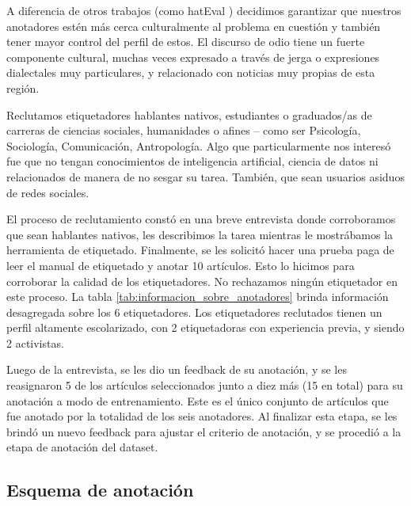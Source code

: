 A diferencia de otros trabajos (como hatEval \cite{hateval2019semeval}) decidimos garantizar que nuestros anotadores estén más cerca culturalmente al problema en cuestión y también tener mayor control del perfil de estos. El discurso de odio tiene un fuerte componente cultural, muchas veces expresado a través de jerga o expresiones dialectales muy particulares, y relacionado con noticias muy propias de esta región.

Reclutamos etiquetadores hablantes nativos, estudiantes o graduados/as de carreras de ciencias sociales, humanidades o afines -- como ser Psicología, Sociología, Comunicación, Antropología. Algo que particularmente nos interesó fue que no tengan conocimientos de inteligencia artificial, ciencia de datos ni relacionados de manera de no sesgar su tarea. También, que sean usuarios asiduos de redes sociales.

El proceso de reclutamiento constó en una breve entrevista donde corroboramos que sean hablantes nativos, les describimos la tarea mientras le mostrábamos la herramienta de etiquetado. Finalmente, se les solicitó hacer una prueba paga de leer el manual de etiquetado y anotar 10 artículos. Esto lo hicimos para corroborar la calidad de los etiquetadores. No rechazamos ningún etiquetador en este proceso. La tabla \ref{tab:informacion_sobre_anotadores} brinda información desagregada sobre los 6 etiquetadores. Los etiquetadores reclutados tienen un perfil altamente escolarizado, con 2 etiquetadoras con experiencia previa, y siendo 2 activistas.

Luego de la entrevista, se les dio un feedback de su anotación, y se les reasignaron 5 de los artículos seleccionados junto a diez más (15 en total) para su anotación a modo de entrenamiento. Este es el único conjunto de artículos que fue anotado por la totalidad de los seis anotadores. Al finalizar esta etapa, se les brindó un nuevo feedback para ajustar el criterio de anotación, y se procedió a la etapa de anotación del dataset.

\subsection{Esquema de anotación}




